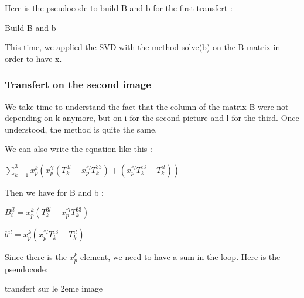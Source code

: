 \documentclass{report}
\begin{document}
Here is the pseudocode to build B and b for the first transfert : 
\begin{algorithm}
\SetLine
\caption{Build B and b}
\SetLine
{}
\end{algorithm}

This time, we applied the SVD with the method solve(b) on the B matrix in order to have x. 

\subsubsection{Transfert on the second image}
We take time to understand the fact that the column of the matrix B were not depending on k anymore, but on i for the second picture and l for the third. Once understood, the method is quite the same. 

We can also write the equation like this : 

\begin{center}
 $ \displaystyle { \sum_{k = 1}^{3}} x_{p}^{k}(x_{p}^{'i} (T_{k}^{3l} - x_{p}^{''l}T_{k}^{33}) + ( x_{p}^{''l}T_{k}^{i3} - T_{k}^{il} ))$
\end{center}

Then we have for B and b :  
\begin{center}
$B_{i}^{il} = x_{p}^{k}(T_{k}^{3l} - x_{p}^{''l}T_{k}^{33})$
\end{center}
\begin{center}
$b^{il} = x_{p}^{k}(x_{p}^{''l}T_{k}^{i3} - T_{k}^{il})$
\end{center}

Since there is the $x_{p}^{k}$ element, we need to have a sum in the loop. Here is the pseudocode:

\begin{algorithm}
\SetLine
\caption{transfert sur le 2eme image}
\SetLine
{}
\end{algorithm}  
\end{document}
